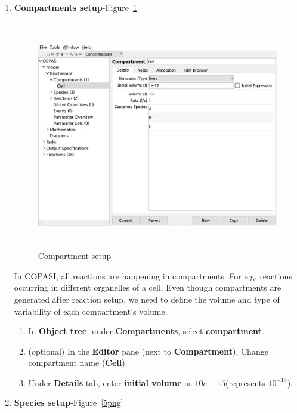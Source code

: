 \documentclass[10pt]{article}
\theoremstyle{definition}
\theoremstyle{remark}
\begin{document}
\begin{enumerate}
		\item {\Large\textbf{Compartments setup}}-Figure~\ref{4png} \\
		\begin{figure}[!htb]
			\centering
			\includegraphics[height=10cm]{Images/4b.png}
			\caption{Compartment setup}
			\label{4png}
		\end{figure}
In COPASI, all reactions are happening in compartments. For e.g. reactions occurring in different organelles of a cell. Even though compartments are generated after reaction setup, we need to define the volume and type of variability of each compartment's volume. 
		\begin{enumerate} 
			\item In \textbf{Object tree}, under \textbf{Compartments}, select \textbf{compartment}.
			\item (optional) In the \textbf{Editor} pane (next to \textbf{Compartment}), Change compartment name (\textbf{Cell}).
			\item Under \textbf{Details} tab, enter \textbf{initial volume} as $10e-15$(represents $10^{-15}$).\\
		\end{enumerate}
		\item {\Large\textbf{Species setup}}-Figure~\ref{5png}\\
		\begin{figure}[!htb]

\end{figure}
\end{enumerate}
\end{document}
